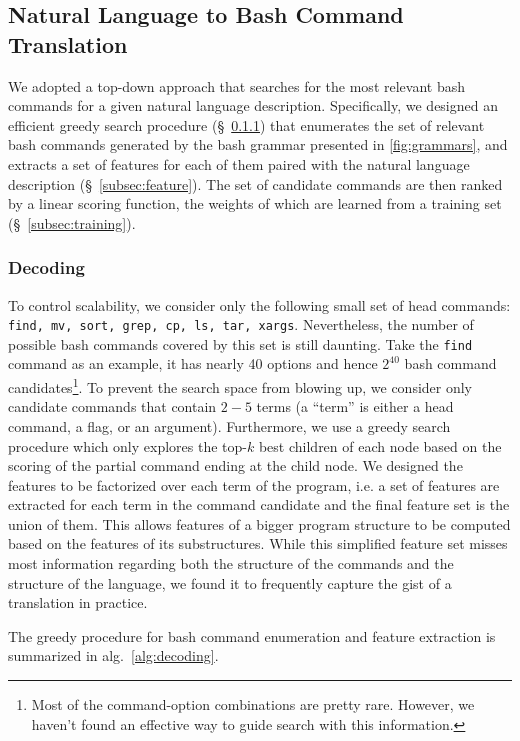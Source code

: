 \subsection{Natural Language to Bash Command Translation}
\label{subsec:parser}

We adopted a top-down approach that searches for the most relevant bash commands for a given natural language description. Specifically, we designed an efficient greedy search procedure (\S~\ref{subsec:decoding}) that enumerates the set of relevant bash commands generated by the bash grammar presented in \autoref{fig:grammars}, and extracts a set of features for each of them paired with the natural language description (\S~\ref{subsec:feature}). The set of candidate commands are then ranked by a linear scoring function, the weights of which are learned from a training set (\S~\ref{subsec:training}).

\subsubsection{Decoding}
\label{subsec:decoding}

To control scalability, we consider only the following small set of head commands: \texttt{find, mv, sort, grep, cp, ls, tar, xargs}. Nevertheless, the number of possible bash commands covered by this set is still daunting. Take the \texttt{find} command as an example, it has nearly 40 options and hence $2^{40}$ bash command candidates\footnote{Most of the command-option combinations are pretty rare. However, we haven't found an effective way to guide search with this information.}. To prevent the search space from blowing up, we consider only candidate commands that contain $2-5$ terms (a ``term'' is either a head command, a flag, or an argument). Furthermore, we use a greedy search procedure which only explores the top-$k$ best children of each node based on the scoring of the partial command ending at the child node. We designed the features to be factorized over each term of the program, i.e. a set of features are extracted for each term in the command candidate and the final feature set is the union of them. This allows features of a bigger program structure to be computed based on the features of its substructures. While this simplified feature set misses most information regarding both the structure of the commands and the structure of the language, we found it to frequently capture the gist of a translation in practice.

The greedy procedure for bash command enumeration and feature extraction is summarized in alg.~\ref{alg:decoding}.

